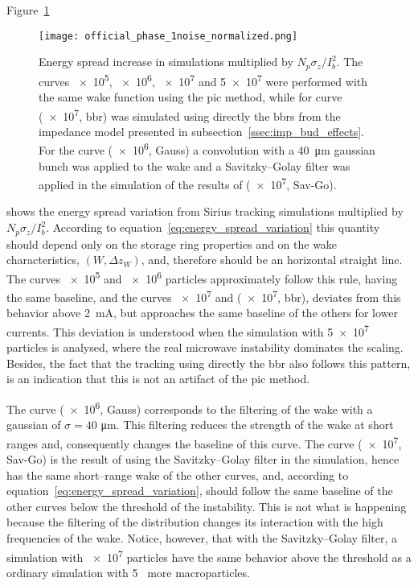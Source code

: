     Figure~\ref{fig:noise_effect}
    \begin{figure}
        \centering
        \texttt{[image: official\_phase\_1noise\_normalized.png]}
        \caption[Normalized energy spread increase in Simulations induced by noise.]{Energy spread increase in simulations multiplied by $N_p\sigma_z/I_b^2$. The curves \num{e5}, \num{e6}, \num{e7} and \num{5e7} were performed with the same wake function using the \gls{pic} method, while for curve (\num{e7}, \gls{bbr}) was simulated using directly the \glspl{bbr} from the impedance model presented in subsection~\ref{ssec:imp_bud_effects}.
        For the curve (\num{e6}, Gauss) a convolution with a \SI{40}{\micro\meter} gaussian bunch was applied to the wake and a Savitzky--Golay filter was applied in the simulation of the results of (\num{e7}, Sav-Go).}
        \label{fig:noise_effect}
    \end{figure}
    shows the energy spread variation from Sirius tracking simulations multiplied by $N_p\sigma_z/I_b^2$. According to equation~\eqref{eq:energy_spread_variation} this quantity should depend only on the storage ring properties and on the wake characteristics, $(W, \Delta z_W)$, and, therefore should be an horizontal straight line. The curves \num{e5} and \num{e6} particles approximately follow this rule, having the same baseline, and the curves \num{e7} and (\num{e7}, \gls{bbr}), deviates from this behavior above \SI{2}{\milli\ampere}, but approaches the same baseline of the others for lower currents. This deviation is understood when the simulation with \num{5e7} particles is analysed, where the real microwave instability dominates the scaling. Besides, the fact that the tracking using directly the \gls{bbr} also follows this pattern, is an indication that this is not an artifact of the \gls{pic} method.

    The curve (\num{e6}, Gauss) corresponds to the filtering of the wake with a gaussian of $\sigma=40$ \si{\micro\meter}. This filtering reduces the strength of the wake at short ranges and, consequently changes the baseline of this curve. The curve (\num{e7}, Sav-Go) is the result of using the Savitzky--Golay filter in the simulation, hence has the same short--range wake of the other curves, and, according to equation~\eqref{eq:energy_spread_variation}, should follow the same baseline of the other curves below the threshold of the instability. This is not what is happening because the filtering of the distribution changes its interaction with the high frequencies of the wake. Notice, however, that with the Savitzky--Golay filter, a simulation with \num{e7} particles have the same behavior above the threshold as a ordinary simulation with \si{5\times} more macroparticles.

